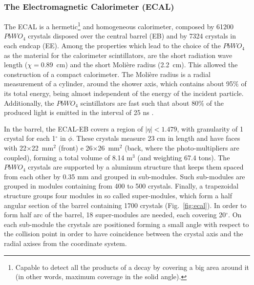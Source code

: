 \subsubsection{The Electromagnetic Calorimeter (ECAL)}
The ECAL is a hermetic\footnote{Capable to detect all the products of a decay by covering a big area around it (in other words, maximum coverage in the solid angle).} and homogeneous calorimeter, composed by 61200 $PbWO_4$ crystals disposed over the central barrel (EB) and by 7324 crystals in each endcap (EE). Among the properties which lead to the choice of the $PbWO_4$ as the material for the calorimeter scintillators, are the short radiation wave length ($\chi=0.89$~cm) and the short Molière radius (2.2~cm). This allowed the construction of a compact calorimeter. The Molière radius is a radial measurement of a cylinder, around the shower axis, which contains about 95$\%$ of its total energy, being almost independent of the energy of the incident particle. Additionally, the $PbWO_4$ scintillators are fast such that about 80$\%$ of the produced light is emitted in the interval of 25 ns \cite{bib:JINST-3-362-2008,bib:grupen-2008}.

In the barrel, the ECAL-EB covers a region of $|\eta| < 1.479$, with granularity of 1 crystal for each 1$^{\circ}$ in $\phi$. These crystals measure 23 cm in length and have faces with 22$\times$22~mm$^{2}$ (front) e 26$\times$26~mm$^{2}$ (back, where the photo-multipliers are coupled), forming a total volume of 8.14 m$^{3}$ (and weighting 67.4 tons). The $PbWO_4$ crystals are supported by a aluminum structure that keeps them spaced from each other by 0.35 mm and grouped in sub-modules. Such sub-modules are grouped in modules containing from 400 to 500 crystals. Finally, a trapezoidal structure groups four modules in so called super-modules, which form a half angular section of the barrel containing 1700 crystals (Fig.~\ref{fig:ecal}). In order to form half arc of the barrel, 18 super-modules are needed, each covering 20$^{\circ}$. On each sub-module the crystals are positioned forming a small angle with respect to the collision point in order to have coincidence between the crystal axis and the radial axises from the coordinate system.

